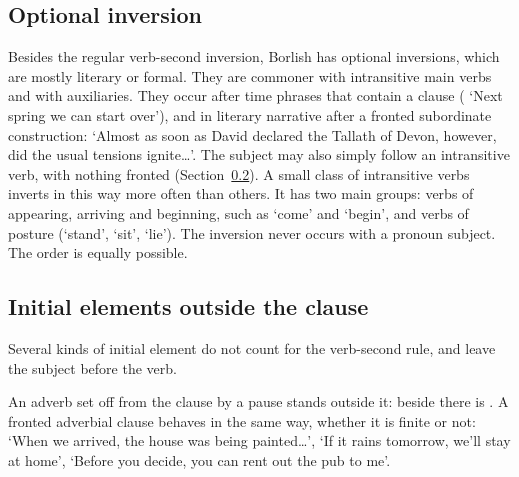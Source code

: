 \subsection{Optional inversion}\label{sec:optional-inversion}
Besides the regular verb-second inversion, Borlish has optional inversions, which are mostly literary or formal. They are commoner with intransitive main verbs and with auxiliaries. They occur after time phrases that contain a clause ( `Next spring we can start over'), and in literary narrative after a fronted subordinate construction:  `Almost as soon as David declared the Tallath of Devon, however, did the usual tensions ignite\ldots'. The subject may also simply follow an intransitive verb, with nothing fronted (Section~\ref{sec:v2-outside}). A small class of intransitive verbs inverts in this way more often than others. It has two main groups: verbs of appearing, arriving and beginning, such as  `come' and  `begin', and verbs of posture (`stand', `sit', `lie'). The inversion never occurs with a pronoun subject.
The order  is equally possible.

\subsection{Initial elements outside the clause}\label{sec:v2-outside}
Several kinds of initial element do not count for the verb-second rule, and leave the subject before the verb.

An adverb set off from the clause by a pause stands outside it: beside  there is . A fronted adverbial clause behaves in the same way, whether it is finite or not:  `When we arrived, the house was being painted\ldots',  `If it rains tomorrow, we'll stay at home',  `Before you decide, you can rent out the pub to me'.

